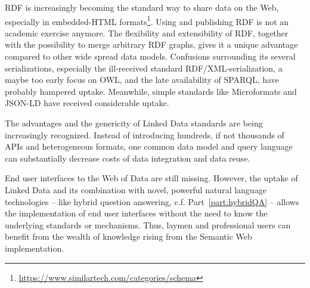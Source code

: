 RDF is increasingly becoming the standard way to share data on the Web, especially in embedded-HTML formats\footnote{\url{https://www.similartech.com/categories/schema}}.
Using and publishing RDF is not an academic exercise anymore.
The flexibility and extensibility of RDF, together with the possibility to merge arbitrary RDF graphs, gives it a unique advantage compared to other wide spread data models.
Confusions surrounding its several serializations, especially the ill-received standard RDF/XML-serialization, a maybe too early focus on OWL, and the late availability of SPARQL, have probably hampered uptake.
Meanwhile, simple standards like Microformats and JSON-LD have received considerable uptake.

The advantages and the genericity of Linked Data standards are being increasingly recognized.
Instead of introducing hundreds, if not thousands of APIs and heterogeneous formats, one common data model and query language can substantially decrease costs of data integration and data reuse.

End user interfaces to the Web of Data are still missing.
However, the uptake of Linked Data and its combination with novel, powerful natural language technologies -- like hybrid question answering, c.f. Part~\ref{part:hybridQA} -- allows the implementation of end user interfaces without the need to know the underlying standards or mechanisms.
Thus, laymen and professional users can benefit from the wealth of knowledge rising from the Semantic Web implementation.

